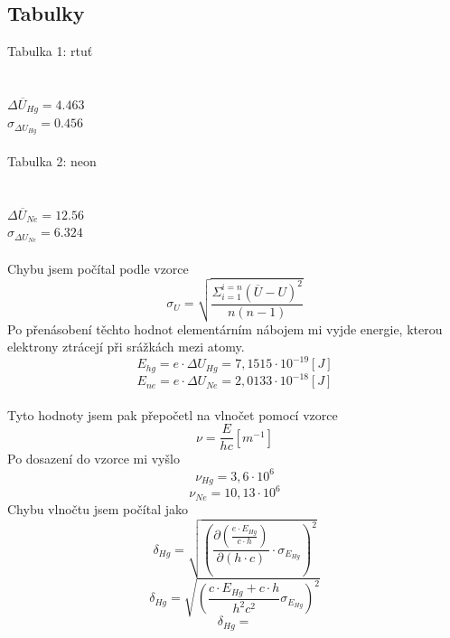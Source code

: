 \documentclass{article}
\begin{document}
\subsection{Tabulky}
\footnotesize{Tabulka 1: rtuť}\\
\\
\vspace{1em}
\\
$\overline{\Delta U_{Hg}} = 4.463$\\
$\sigma_{\Delta U}_{Hg} = 0.456$
\\
\vspace{1em}
\\
\footnotesize{Tabulka 2: neon}\\
\\
\vspace{1em}
\\
$\overline{\Delta U_{Ne}} = 12.56$\\
$\sigma_{\Delta U}_{Ne} = 6.324$
\\
\vspace{1em}
\\
Chybu jsem počítal podle vzorce
$$\sigma_{U} = \sqrt{\frac{ \Sigma_{i=1}^{i=n}(\overline{U}-U)^{2} }{n(n-1)} }$$
\vspace{2em}
Po přenásobení těchto hodnot elementárním nábojem mi vyjde energie, kterou elektrony ztrácejí při srážkách mezi atomy.
$$E_{hg} = e \cdot \Delta U_{Hg} = 7,1515 \cdot 10^{-19} [J]$$
$$E_{ne} = e \cdot \Delta U_{Ne} = 2,0133 \cdot 10^{-18} [J]$$
\\
Tyto hodnoty jsem pak přepočetl na vlnočet pomocí vzorce
$$\nu = \frac{E}{hc} [m^{-1}]$$
Po dosazení do vzorce mi vyšlo
$$\nu_{Hg} = 3,6 \cdot 10^{6}$$
$$\nu_{Ne} = 10,13 \cdot 10^{6}$$
\newpage
Chybu vlnočtu jsem počítal jako
$$\delta_{Hg} = \sqrt{ \left(  \frac{ \partial \left( \frac{e \cdot E_{Hg}}{c \cdot h} \right) }{ \partial (h \cdot c) } \cdot \sigma_{E}_{Hg}  \right)^{2} }$$
$$\delta_{Hg} = \sqrt{ \left( \frac{c \cdot E_{Hg} + c \cdot h}{h^{2} c^{2}} \sigma_{E}_{Hg} \right)^{2} }$$
$$\delta_{Hg} = $$
\end{document}
